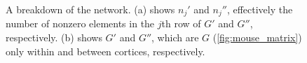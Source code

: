 \begin{figure}[ht]
  \centering

  \caption[Network breakdown]{A breakdown of the network.
    (a) shows $n_{j}'$ and $n_{j}''$, effectively the number of nonzero elements in the $j$th row of $G'$ and $G''$, respectively.
    (b) shows $G'$ and $G''$, which are $G$ (\cref{fig:mouse_matrix}) only within and between cortices, respectively.
  }
  \label{fig:network_breakdown}
\end{figure}

